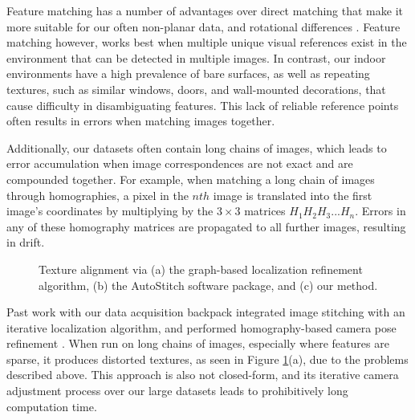 \documentclass[]{spie}  %
\begin{document}
Feature matching has a number of advantages over direct matching that
make it more suitable for our often non-planar data, and rotational
differences \cite{szeliski2006image}. Feature matching however, works
best when multiple unique visual references exist in the environment
that can be detected in multiple images. In contrast, our indoor
environments have a high prevalence of bare surfaces, as well as
repeating textures, such as similar windows, doors, and wall-mounted
decorations, that cause difficulty in disambiguating features. This
lack of reliable reference points often results in errors when
matching images together.

Additionally, our datasets often contain long chains of images, which
leads to error accumulation when image correspondences are not exact
and are compounded together. For example, when matching a long chain
of images through homographies, a pixel in the $nth$ image is
translated into the first image's coordinates by multiplying by the
$3\times3$ matrices $H_1 H_2 H_3 ... H_n$. Errors in any of these
homography matrices are propagated to all further images, resulting in
drift.

\begin{figure}
  \centering

  \centering

  \centering {}

  \caption{Texture alignment via (a) the graph-based localization
    refinement algorithm, (b) the AutoStitch software package, and (c)
    our method.}
  \label{fig:mosaic3D}
\end{figure}


Past work with our data acquisition backpack integrated image
stitching with an iterative localization algorithm, and performed
homography-based camera pose refinement \cite{liu2010indoor}. When run
on long chains of images, especially where features are sparse, it
produces distorted textures, as seen in Figure \ref{fig:mosaic3D}(a),
due to the problems described above. This approach is also not
closed-form, and its iterative camera adjustment process over our
large datasets leads to prohibitively long computation time.
\end{document}
